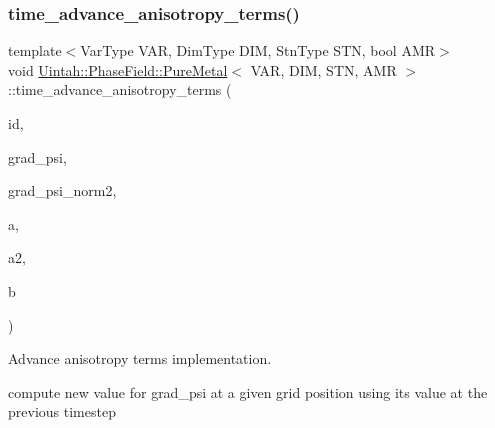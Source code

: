 \subsubsection{\texorpdfstring{time\+\_\+advance\+\_\+anisotropy\+\_\+terms()}{time\_advance\_anisotropy\_terms()}}
{\footnotesize\ttfamily template$<$Var\+Type V\+AR, Dim\+Type D\+IM, Stn\+Type S\+TN, bool A\+MR$>$ \\
void \hyperlink{classUintah_1_1PhaseField_1_1PureMetal}{Uintah\+::\+Phase\+Field\+::\+Pure\+Metal}$<$ V\+AR, D\+IM, S\+TN, A\+MR $>$\+::time\+\_\+advance\+\_\+anisotropy\+\_\+terms (\begin{DoxyParamCaption}\item[{const Int\+Vector \&}]{id,  }\item[{\hyperlink{namespaceUintah_1_1PhaseField_a59210a1e28eba254d428762c92ddeabb}{View}$<$ \hyperlink{structUintah_1_1PhaseField_1_1VectorField}{Vector\+Field}$<$ const double, D\+IM $>$ $>$ \&}]{grad\+\_\+psi,  }\item[{\hyperlink{namespaceUintah_1_1PhaseField_a59210a1e28eba254d428762c92ddeabb}{View}$<$ \hyperlink{structUintah_1_1PhaseField_1_1ScalarField}{Scalar\+Field}$<$ const double $>$ $>$ \&}]{grad\+\_\+psi\+\_\+norm2,  }\item[{\hyperlink{namespaceUintah_1_1PhaseField_a59210a1e28eba254d428762c92ddeabb}{View}$<$ \hyperlink{structUintah_1_1PhaseField_1_1ScalarField}{Scalar\+Field}$<$ double $>$ $>$ \&}]{a,  }\item[{\hyperlink{namespaceUintah_1_1PhaseField_a59210a1e28eba254d428762c92ddeabb}{View}$<$ \hyperlink{structUintah_1_1PhaseField_1_1ScalarField}{Scalar\+Field}$<$ double $>$ $>$ \&}]{a2,  }\item[{\hyperlink{namespaceUintah_1_1PhaseField_a59210a1e28eba254d428762c92ddeabb}{View}$<$ \hyperlink{structUintah_1_1PhaseField_1_1VectorField}{Vector\+Field}$<$ double, B\+SZ $>$ $>$ \&}]{b }\end{DoxyParamCaption})\hspace{0.3cm}{\ttfamily [protected]}}



Advance anisotropy terms implementation. 

compute new value for grad\+\_\+psi at a given grid position using its value at the previous timestep


